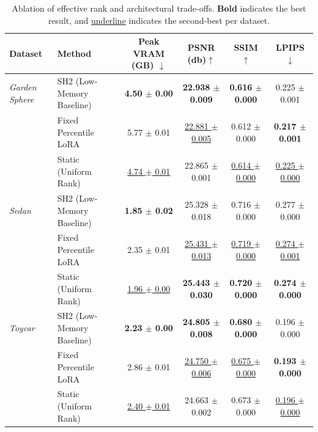 \documentclass[sigconf]{acmart}
\begin{document}



\begin{table}[htbp]
\centering
\begin{tabular}{llcccc}
\toprule
\textbf{Dataset} & \textbf{Method} & \textbf{Peak VRAM (GB) $\downarrow$} & \textbf{PSNR (db)$\uparrow$} & \textbf{SSIM $\uparrow$} & \textbf{LPIPS $\downarrow$} \\
\midrule
\textit{Garden Sphere} & SH2 (Low-Memory Baseline) & \textbf{4.50 $\pm$ 0.00} & \textbf{22.938 $\pm$ 0.009} & \textbf{0.616 $\pm$ 0.000} & 0.225 $\pm$ 0.001 \\
 & Fixed Percentile LoRA & 5.77 $\pm$ 0.01 & \underline{22.881 $\pm$ 0.005} & 0.612 $\pm$ 0.000 & \textbf{0.217 $\pm$ 0.001} \\
 & Static (Uniform Rank) & \underline{4.74 $\pm$ 0.01} & 22.865 $\pm$ 0.001 & \underline{0.614 $\pm$ 0.000} & \underline{0.225 $\pm$ 0.000} \\
\midrule
\textit{Sedan} & SH2 (Low-Memory Baseline) & \textbf{1.85 $\pm$ 0.02} & 25.328 $\pm$ 0.018 & 0.716 $\pm$ 0.000 & 0.277 $\pm$ 0.000 \\
 & Fixed Percentile LoRA & 2.35 $\pm$ 0.01 & \underline{25.431 $\pm$ 0.013} & \underline{0.719 $\pm$ 0.000} & \underline{0.274 $\pm$ 0.001} \\
 & Static (Uniform Rank) & \underline{1.96 $\pm$ 0.00} & \textbf{25.443 $\pm$ 0.030} & \textbf{0.720 $\pm$ 0.000} & \textbf{0.274 $\pm$ 0.000} \\
\midrule
\textit{Toycar} & SH2 (Low-Memory Baseline) & \textbf{2.23 $\pm$ 0.00} & \textbf{24.805 $\pm$ 0.008} & \textbf{0.680 $\pm$ 0.000} & 0.196 $\pm$ 0.000 \\
 & Fixed Percentile LoRA & 2.86 $\pm$ 0.01 & \underline{24.750 $\pm$ 0.006} & \underline{0.675 $\pm$ 0.000} & \textbf{0.193 $\pm$ 0.000} \\
 & Static (Uniform Rank) & \underline{2.40 $\pm$ 0.01} & 24.663 $\pm$ 0.002 & 0.673 $\pm$ 0.000 & \underline{0.196 $\pm$ 0.000} \\
\bottomrule
\end{tabular}
\caption{Ablation of effective rank and architectural trade-offs. \textbf{Bold} indicates the best result, and \underline{underline} indicates the second-best per dataset.}
\label{tab:ablation_routing}
\end{table}
\end{document}
